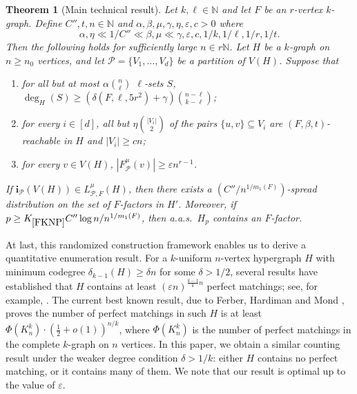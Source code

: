 \documentclass[11pt, letterpaper]{amsart}
\theoremstyle{plain}
\numberwithin{equation}{section}
\newtheorem{theorem}[thm]{Theorem}
\theoremstyle{definition}
\newcommand\card[1]{\left| #1 \right|}
\renewcommand{\vec}[1]{{\mathbf #1}}
\begin{document}
     \begin{theorem}
     [Main technical result]\label{main theorem}
         Let $k,\ell\in \mathbb{N}$ and let $F$ be an $r$-vertex $k$-graph. 
         Define $C'',t,n\in\mathbb{N}$ and $\alpha,\beta,\mu,\gamma,\eta,\varepsilon,c>0$ where
\[ \alpha,\eta\ll 1/C''\ll\beta,\mu\ll\gamma,\varepsilon,c,1/k,1/\ell,1/r,1/t.
\]
         Then the following holds for sufficiently large \(n\in r\mathbb{N}\). Let $H$ be a $k$-graph on $n\ge n_0$ vertices, and let $\mathcal{P}=\{V_1,\dots,V_d\}$ be a partition of $ V(H)$. 
         Suppose that 
      \begin{enumerate}[label=(\roman*)]
             \item for all but at most $\alpha\binom{n}{\ell}$ $\ell$-sets $S$, $\deg_H(S)\ge (\delta(F,\ell,5r^2)+ \gamma)\binom{n-\ell}{k-\ell}$;\label{item:main-degree}
             \item for every $i\in [d]$, all but $\eta\binom{\card{V_i}}{2}$ of the pairs $\{u,v\}\subseteq V_i$ are $(F,\beta,t)$-reachable in $H$ and $\card{V_i}\ge cn$;\label{item:main-good partition}
             \item for every $ v\in V(H) $, $ \card{F^{\mu}_{\mathcal{P}}(v)}\ge \varepsilon n^{r-1} $.\label{item:main-robust edges}
         \end{enumerate}
         If $\vec{i}_{ \mathcal{P}}(V(H))\in L_{ \mathcal{P},F}^{\mu}(H)$, then there exists a $(C''/n^{1/m_1(F)})$-spread distribution on the set of $F$-factors in $H'$. 
         Moreover, if \(p\ge K_{\ref{FKNP}}C''\log n/n^{1/m_1(F)} \), then a.a.s.~$H_p$ contains an $F$-factor.
     \end{theorem} 


    
    At last, this randomized construction framework enables us to derive a quantitative enumeration result. 
     For a \(k\)-uniform \(n\)-vertex hypergraph \(H\) with minimum codegree \(\delta_{k-1}(H)\ge\delta n\) for some \(\delta > 1/2\), several results have established that \(H\) contains at least \((\varepsilon n)^{\frac{k-1}{k}n}\) perfect matchings; see, for example, \cite{glock2021counting, kang2024perfect, pham2022toolkit}. 
     The current best known result, due to Ferber, Hardiman and Mond \cite{ferber2023counting}, proves the number of perfect matchings in such \(H\) is at least \(\Phi(K_n^k)\cdot \left(\frac{1}{2}+o(1)\right)^{n/k}\), where \(\Phi(K_n^k)\) is the number of perfect matchings in the complete \(k\)-graph on \(n\) vertices. 
     In this paper, we obtain a similar counting result under the weaker degree condition \(\delta >1/k\): either \(H\) contains no perfect matching, or it contains many of them. 
     We note that our result is optimal up to the value of $\varepsilon$.
\end{document}
